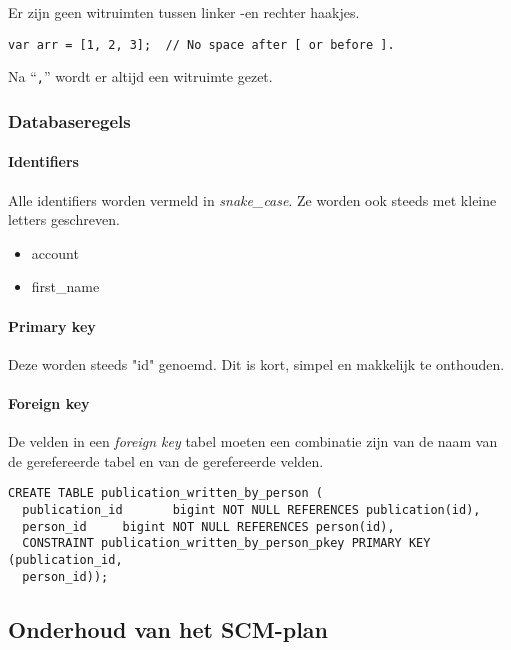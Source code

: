 Er zijn geen witruimten tussen linker -en rechter haakjes.\\
\begin{lstlisting}
var arr = [1, 2, 3];  // No space after [ or before ].
\end{lstlisting}

Na ``\lstinline{,}'' wordt er altijd een witruimte gezet.

\subsubsection{Databaseregels}

\paragraph{Identifiers}

Alle identifiers worden vermeld in \textit{snake\_case}. Ze worden ook steeds met kleine letters geschreven.

\begin{itemize}
\item account
\item first\_name
\end{itemize}

\paragraph{Primary key}

Deze worden steeds "id" genoemd. Dit is kort, simpel en makkelijk te onthouden.

\paragraph{Foreign key}

De velden in een \textit{foreign key} tabel moeten een combinatie zijn van de naam van de gerefereerde tabel en van de gerefereerde velden.

\begin{lstlisting}
CREATE TABLE publication_written_by_person (
  publication_id       bigint NOT NULL REFERENCES publication(id),
  person_id     bigint NOT NULL REFERENCES person(id),
  CONSTRAINT publication_written_by_person_pkey PRIMARY KEY (publication_id,
  person_id));
\end{lstlisting}

\subsection{Onderhoud van het SCM-plan}

